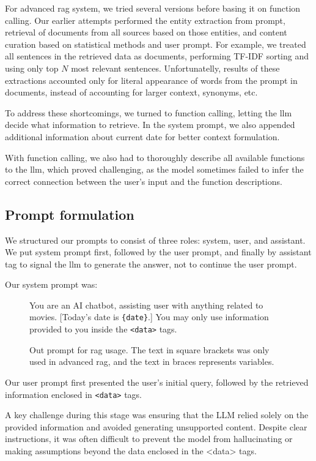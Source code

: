\documentclass[fleqn,moreauthors,10pt]{ds_report}
\begin{document}
For advanced \ac{rag} system, we tried several versions before basing it on function calling. Our earlier attempts performed the entity extraction from prompt, retrieval of documents from all sources based on those entities, and content curation based on statistical methods and user prompt. For example, we treated all sentences in the retrieved data as documents, performing TF-IDF sorting and using only top $N$ most relevant sentences. Unfortunatelly, results of these extractions accounted only for literal appearance of words from the prompt in documents, instead of accounting for larger context, synonyms, etc.

To address these shortcomings, we turned to function calling, letting the \ac{llm} decide what information to retrieve. In the system prompt, we also appended additional information about current date for better context formulation.

With function calling, we also had to thoroughly describe all available functions to the \ac{llm}, which proved challenging, as the model sometimes failed to infer the correct connection between the user's input and the function descriptions.

\subsection*{Prompt formulation}

We structured our prompts to consist of three roles: system, user, and assistant. We put system prompt first, followed by the user prompt, and finally by assistant tag to signal the \ac{llm} to generate the answer, not to continue the user prompt.

Our system prompt was:

\begin{figure}[h!]
	\begin{tcolorbox}
		You are an AI chatbot, assisting user with anything related to movies. [Today's date is \verb|{date}|.] You may only use information provided to you inside the \verb|<data>| tags.
	\end{tcolorbox}
	\caption{Out prompt for \ac{rag} usage. The text in square brackets was only used in advanced \ac{rag}, and the text in braces represents variables.}
\end{figure}

Our user prompt first presented the user's initial query, followed by the retrieved information enclosed in \verb|<data>| tags.

A key challenge during this stage was ensuring that the LLM relied solely on the provided information and avoided generating unsupported content. Despite clear instructions, it was often difficult to prevent the model from hallucinating or making assumptions beyond the data enclosed in the <data> tags.
\end{document}
